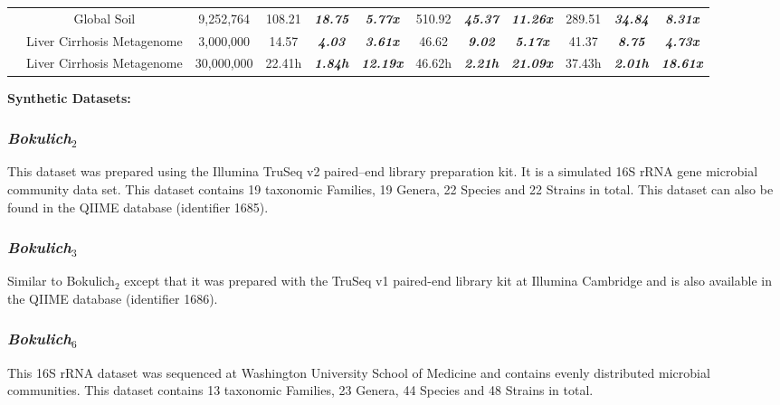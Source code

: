 \documentclass[10pt, conference, compsocconf]{IEEEtran}
\begin{document}
\begin{table}
{\begin{tabular}{|c c c|c c c|c c c|c c c|}
			& Global Soil & 9,252,764 & 108.21 &  \textit{\textbf{18.75}} & \textit{\textbf{5.77x}} & 510.92 & \textit{\textbf{45.37}} & \textit{\textbf{11.26x}} & 289.51 &  \textit{\textbf{34.84}} & \textit{\textbf{8.31x}}\\
			
			& Liver Cirrhosis Metagenome & 3,000,000 & 14.57 &  \textit{\textbf{4.03}} & \textit{\textbf{3.61x}} & 46.62 & \textit{\textbf{9.02}} & \textit{\textbf{5.17x}} & 41.37 &  \textit{\textbf{8.75}} & \textit{\textbf{4.73x}}\\
			
			& Liver Cirrhosis Metagenome & 30,000,000 & 22.41h &  \textit{\textbf{1.84h}} & \textit{\textbf{12.19x}} & 46.62h & \textit{\textbf{2.21h}} & \textit{\textbf{21.09x}} & 37.43h &  \textit{\textbf{2.01h}} & \textit{\textbf{18.61x}}\\		
			
			\hline 
			
		\end{tabular}
	}
\end{table} 

\textbf{Synthetic Datasets:}

\subsubsection{\textit{Bokulich$_2$}}
This dataset was prepared using the 
Illumina TruSeq v2 paired--end library
preparation kit. It is a simulated 16S rRNA gene 
microbial community data set.
This 
dataset contains 19 taxonomic Families, 19 Genera, 22 Species 
and 22 Strains in total. This dataset can also be 
found in the QIIME database (identifier 1685).

\subsubsection{\textit{Bokulich$_3$}}
Similar to Bokulich$_2$ except that it was 
prepared with the 
TruSeq v1 paired-end library kit at 
Illumina Cambridge and is  also available in the 
QIIME database (identifier 1686).

\subsubsection{\textit{Bokulich$_6$}}
This  16S rRNA dataset 
was sequenced at Washington University School of Medicine and contains evenly distributed microbial communities. This dataset contains 13 taxonomic Families, 23 Genera, 44 Species and 48 Strains in total.
\end{document}
